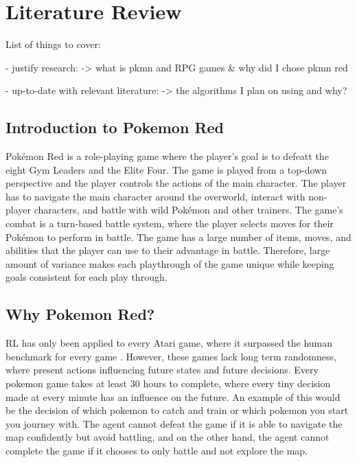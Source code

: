 \section{Literature Review}

List of things to cover:

- justify research: -> what is pkmn and RPG games \& why did I chose pkmn red

- up-to-date with relevant literature: -> the algorithms I plan on using and why?

\subsection{Introduction to Pokemon Red}

Pokémon Red is a role-playing game where the player's goal is to defeatt the eight Gym Leaders and the Elite Four. The game is played from a top-down perspective and the player controls the actions of the main character. The player has to navigate the main character around the overworld, interact with non-player characters, and battle with wild Pokémon and other trainers. The game's combat is a turn-based battle system, where the player selects moves for their Pokémon to perform in battle. The game has a large number of items, moves, and abilities that the player can use to their advantage in battle. Therefore, large amount of variance makes each playthrough of the game unique while keeping goals consistent for each play through.

\subsection{Why Pokemon Red?}

RL has only been applied to every Atari game, where it surpassed the human benchmark for every game \cite{brockman2016openai}. However, these games lack long term randomness, where present actions influencing future states and future decisions. Every pokemon game takes at least 30 hours to complete, where every tiny decision made at every minute has an influence on the future. An example of this would be the decision of which pokemon to catch and train or which pokemon you start you journey with. The agent cannot defeat the game if it is able to navigate the map confidently but avoid battling, and on the other hand, the agent cannot complete the game if it chooses to only battle and not explore the map.
 
